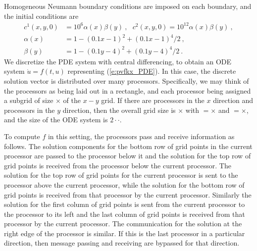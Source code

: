 Homogeneous Neumann boundary conditions are imposed on each boundary, and the
initial conditions are 
\begin{equation} \label{e:pvfkx_IC}
  \begin{split}
  c^{1}(x,y,0) &= 10^{6}\alpha (x)\beta (y) ~,~~~ 
                    c^{2}(x,y,0)=10^{12}\alpha(x)\beta (y) ~, \\
  \alpha (x) &= 1-(0.1x-1)^{2}+(0.1x-1)^{4}/2 ~, \\
  \beta (y) &= 1-(0.1y-4)^{2}+(0.1y-4)^{4}/2 ~.
  \end{split} 
\end{equation}
We discretize the PDE system with central differencing, to
obtain an ODE system $\dot{u} = f(t,u)$ representing (\ref{e:pvfkx_PDE}).  
In this case, the discrete solution vector is distributed over
many processors.  Specifically, we may think of the processors as
being laid out in a rectangle, and each processor being assigned a
subgrid of size $\times$ of the $x-y$ grid. If
there are  processors in the $x$ direction and 
processors in the $y$ direction, then the overall grid size is
$\times$ with $=$$\times$ and
$=$$\times$, and the size of the ODE system is
$2\cdot$$\cdot$.  

To compute $f$ in this setting, the processors pass and receive
information as follows.  The solution components for the bottom row of
grid points in the current processor are passed to the processor below
it and the solution for the top row of grid points is received from
the processor below the current processor. The solution for the top
row of grid points for the current processor is sent to the processor
above the current processor, while the solution for the bottom row of
grid points is received from that processor by the current
processor. Similarly the solution for the first column of grid points
is sent from the current processor to the processor to its left and
the last column of grid points is received from that processor by the
current processor. The communication for the solution at the right
edge of the processor is similar. If this is the last processor in a
particular direction, then message passing and receiving are bypassed
for that direction.

